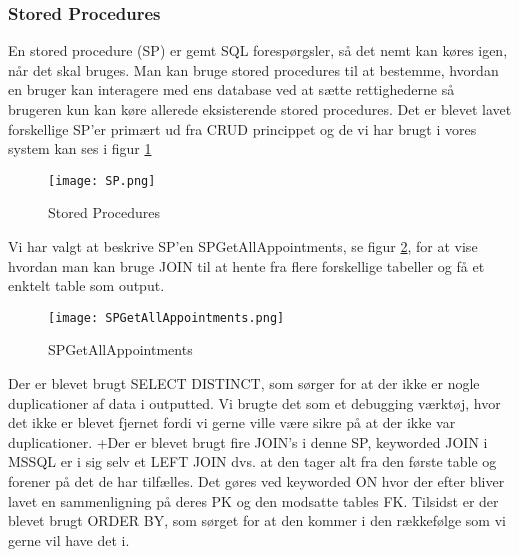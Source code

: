 \subsubsection{Stored Procedures}
En stored procedure (SP) er gemt SQL forespørgsler, så det nemt kan køres igen, når det skal bruges.
Man kan bruge stored procedures til at bestemme, hvordan en bruger kan interagere med ens database ved at sætte rettighederne så brugeren kun kan køre allerede eksisterende stored procedures.
Det er blevet lavet forskellige SP'er primært ud fra CRUD princippet og de vi har brugt i vores system kan ses i figur \ref{StoredProcedures}

\begin{figure}[h]
    \caption{Stored Procedures}
    \centering
        \texttt{[image: SP.png]}
    \label{StoredProcedures}
\end{figure}

Vi har valgt at beskrive SP'en SPGetAllAppointments, se figur \ref{SPGetAllAppointments}, for at vise hvordan man kan bruge JOIN til at hente fra flere forskellige tabeller og få et enktelt table som output.

\begin{figure}[h]
    \caption{SPGetAllAppointments}
    \centering
        \texttt{[image: SPGetAllAppointments.png]}
    \label{SPGetAllAppointments}
\end{figure}

Der er blevet brugt SELECT DISTINCT, som sørger for at der ikke er nogle duplicationer af data i outputted. Vi brugte det som et debugging værktøj, hvor det ikke er blevet fjernet fordi vi gerne ville være sikre på at der ikke var duplicationer.
+Der er blevet brugt fire JOIN's i denne SP, keyworded JOIN i MSSQL er i sig selv et LEFT JOIN dvs. at den tager alt fra den første table og forener på det de har tilfælles. Det gøres ved keyworded ON hvor der efter bliver lavet en sammenligning på deres PK og den modsatte tables FK.
Tilsidst er der blevet brugt ORDER BY, som sørget for at den kommer i den rækkefølge som vi gerne vil have det i.
